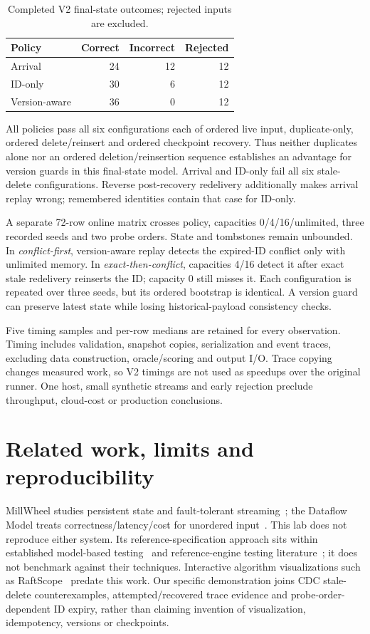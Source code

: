 \documentclass[sigconf,9pt,review]{acmart}
\begin{document}
\begin{table}[t]
\caption{Completed V2 final-state outcomes; rejected inputs are excluded.}
\label{tab:results}
\centering
\begin{tabular}{lrrr}\toprule
Policy & Correct & Incorrect & Rejected\\\midrule
Arrival & 24 & 12 & 12\\
ID-only & 30 & 6 & 12\\
Version-aware & 36 & 0 & 12\\\bottomrule
\end{tabular}
\end{table}
All policies pass all six configurations each of ordered live input, duplicate-only,
ordered delete/reinsert and ordered checkpoint recovery. Thus neither duplicates
alone nor an ordered deletion/reinsertion sequence establishes an advantage for
version guards in this final-state model. Arrival and ID-only fail all six stale-delete
configurations. Reverse post-recovery redelivery additionally makes arrival replay
wrong; remembered identities contain that case for ID-only.

A separate 72-row online matrix crosses policy, capacities 0/4/16/unlimited, three
recorded seeds and two probe orders. State and tombstones remain unbounded. In
\emph{conflict-first}, version-aware replay detects the expired-ID conflict only with
unlimited memory. In \emph{exact-then-conflict}, capacities 4/16 detect it after exact
stale redelivery reinserts the ID; capacity 0 still misses it. Each configuration is
repeated over three seeds, but its ordered bootstrap is identical. A version guard
can preserve latest state while losing historical-payload consistency checks.

Five timing samples and per-row medians are retained for every observation. Timing
includes validation, snapshot copies, serialization and event traces, excluding data
construction, oracle/scoring and output I/O. Trace copying changes measured work, so
V2 timings are not used as speedups over the original runner. One host, small synthetic
streams and early rejection preclude throughput, cloud-cost or production conclusions.

\section{Related work, limits and reproducibility}
MillWheel studies persistent state and fault-tolerant streaming~\cite{millwheel}; the
Dataflow Model treats correctness/latency/cost for unordered input~\cite{dataflow}.
This lab does not reproduce either system. Its reference-specification approach sits
within established model-based testing~\cite{mbt} and reference-engine testing
literature~\cite{norec}; it does not benchmark against their techniques. Interactive
algorithm visualizations such as RaftScope~\cite{raftscope} predate this work. Our
specific demonstration joins CDC stale-delete counterexamples, attempted/recovered
trace evidence and probe-order-dependent ID expiry, rather than claiming invention
of visualization, idempotency, versions or checkpoints.
\end{document}
